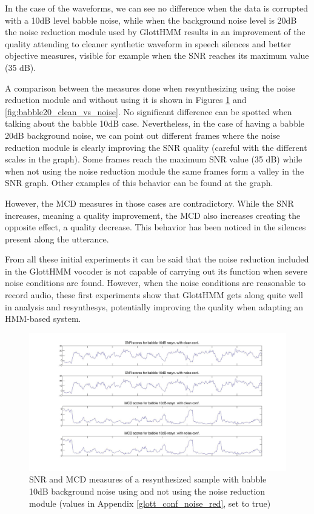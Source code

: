 In the case of the waveforms, we can see no difference when the data is corrupted with a 10dB level babble noise, while when the background noise level is 20dB the noise reduction module used by GlottHMM results in an improvement of the quality attending to cleaner synthetic waveform in speech silences and better objective measures, visible for example when the SNR reaches its maximum value (35 dB). 

A comparison between the measures done when resynthesizing using the noise reduction module and without using it is shown in Figures \ref{fig:babble10_clean_vs_noise} and \ref{fig:babble20_clean_vs_noise}. 
%
No significant difference can be spotted when talking about the babble 10dB case.
%
Nevertheless, in the case of having a babble 20dB background noise, we can point out different frames where the noise reduction module is clearly improving the SNR quality (careful with the different scales in the graph).
%
Some frames reach the maximum SNR value (35 dB) while when not using the noise reduction module the same frames form a valley in the SNR graph.
%
Other examples of this behavior can be found at the graph.

However, the MCD measures in those cases are contradictory. 
%
While the SNR increases, meaning a quality improvement, the MCD also increases creating the opposite effect, a quality decrease.
%
This behavior has been noticed in the silences present along the utterance.

From all these initial experiments it can be said that the noise reduction included in the GlottHMM vocoder is not capable of carrying out its function when severe noise conditions are found.
%
However, when the noise conditions are reasonable to record audio, these first experiments show that GlottHMM gets along quite well in analysis and resynthesys, potentially improving the quality when adapting an HMM-based system. 

\begin{figure}[!htb]
\begin{adjustwidth}{-2.6cm}{}
\includegraphics[width=1.3\textwidth]{images/babble10clean_vs_noise.jpg}
\end{adjustwidth}
\caption{SNR and MCD measures of a resynthesized sample with babble 10dB background noise using and not using the noise reduction module (values in Appendix \ref{glott_conf_noise_red}, set to true)}
\label{fig:babble10_clean_vs_noise}
\end{figure}

